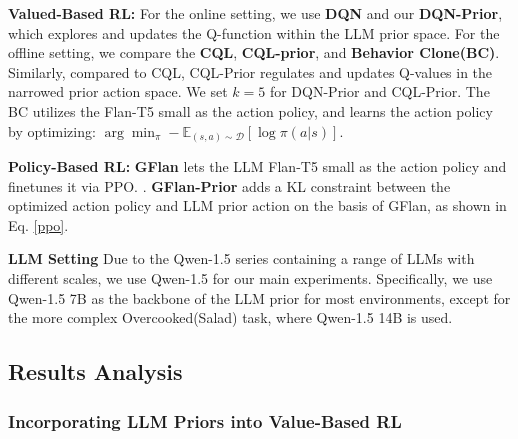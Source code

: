 \documentclass{article} %
\theoremstyle{plain}
\theoremstyle{definition}
\theoremstyle{remark}
\newcommand{\eq}{{Eq. }}
\begin{document}
{\textbf{Valued-Based RL:} For the online setting, we use \textbf{DQN} and our \textbf{DQN-Prior}, which explores and updates the Q-function within the LLM prior space. For the offline setting, we compare the \textbf{CQL}, \textbf{CQL-prior}, and \textbf{Behavior Clone(BC)}. Similarly, compared to {CQL}, {CQL-Prior} regulates and updates Q-values in the narrowed prior action space. We set $k=5$ for DQN-Prior and CQL-Prior. The BC utilizes the Flan-T5 small \citep{rae2021scaling} as the action policy, and learns the action policy by optimizing: $\arg\min_\pi-\mathbb{E}_{(s,a)\sim\mathcal{D}}[\log {\pi(a|s)}].$


\textbf{Policy-Based RL:}
\textbf{GFlan} \citep{carta2023grounding} lets the LLM Flan-T5 small as the action policy and finetunes it via PPO. \citep{schulman2017proximal}. \textbf{GFlan-Prior} adds a KL constraint between the optimized action policy and LLM prior action on the basis of GFlan, as shown in \eq \ref{ppo}. 

\textbf{LLM Setting} Due to the Qwen-1.5 series \citep{bai2023qwen} containing a range of LLMs with different scales, we use Qwen-1.5 for our main experiments. Specifically, we use Qwen-1.5 7B \citep{bai2023qwen} as the backbone of the LLM prior for most environments, except for the more complex Overcooked(Salad) task, where Qwen-1.5 14B is used. 



\subsection{Results Analysis}
\subsubsection{Incorporating LLM Priors into Value-Based RL}
}
\end{document}

